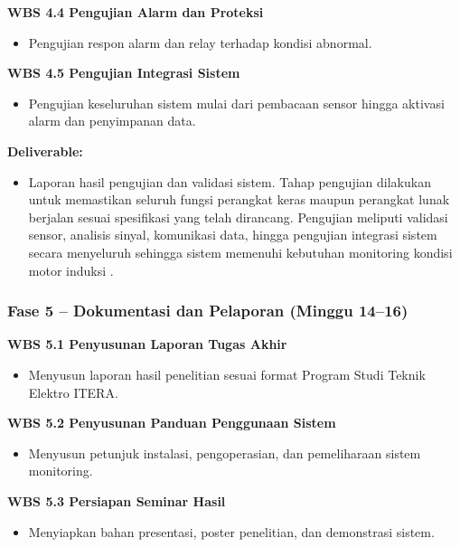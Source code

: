 \documentclass{elsinta}
\begin{document}
\textbf{WBS 4.4 Pengujian Alarm dan Proteksi}

\begin{itemize}
    \item Pengujian respon alarm dan relay terhadap kondisi abnormal.
\end{itemize}

\textbf{WBS 4.5 Pengujian Integrasi Sistem}

\begin{itemize}
    \item Pengujian keseluruhan sistem mulai dari pembacaan sensor hingga aktivasi alarm dan penyimpanan data.
\end{itemize}

\textbf{Deliverable:}
\begin{itemize}
    \item Laporan hasil pengujian dan validasi sistem.
    Tahap pengujian dilakukan untuk memastikan seluruh fungsi perangkat keras maupun perangkat lunak berjalan sesuai spesifikasi yang telah dirancang. Pengujian meliputi validasi sensor, analisis sinyal, komunikasi data, hingga pengujian integrasi sistem secara menyeluruh sehingga sistem memenuhi kebutuhan monitoring kondisi motor induksi \cite{PMBOK,jardine2006}.
\end{itemize}

\subsubsection*{Fase 5 -- Dokumentasi dan Pelaporan (Minggu 14--16)}

\textbf{WBS 5.1 Penyusunan Laporan Tugas Akhir}

\begin{itemize}
    \item Menyusun laporan hasil penelitian sesuai format Program Studi Teknik Elektro ITERA.
\end{itemize}

\textbf{WBS 5.2 Penyusunan Panduan Penggunaan Sistem}

\begin{itemize}
    \item Menyusun petunjuk instalasi, pengoperasian, dan pemeliharaan sistem monitoring.
\end{itemize}

\textbf{WBS 5.3 Persiapan Seminar Hasil}

\begin{itemize}
    \item Menyiapkan bahan presentasi, poster penelitian, dan demonstrasi sistem.
\end{itemize}
\end{document}
